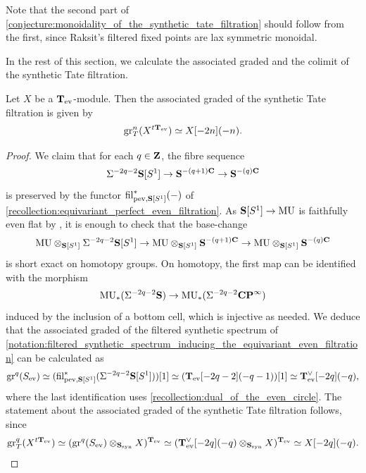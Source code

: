 \documentclass[oneside,a4paper]{amsart}
\begin{document}
\begin{remark}
Note that the second part of \cref{conjecture:monoidality_of_the_synthetic_tate_filtration} should follow from the first, since Raksit's filtered fixed points are lax symmetric monoidal. 
\end{remark}

In the rest of this section, we calculate the associated graded and the colimit of the synthetic Tate filtration. 

\begin{proposition}
\label{proposition:associated_graded_of_the_synthetic_tate_filtration}
Let $X$ be a $\mathbf{T}_{\mathrm{ev}}$-module. Then the associated graded of the synthetic Tate filtration is given by 
\[
\operatorname{gr}^{n}_{T}(X^{t \mathbf{T}_{\mathrm{ev}}}) \simeq X[-2n](-n). 
\]
\end{proposition}

\begin{proof}
We claim that for each $q \in \mathbf{Z}$, the fibre sequence
\[
\Sigma^{-2q-2} \mathbf{S}[S^{1}] \rightarrow \mathbf{S}^{-(q+1)\mathbf{C}} \rightarrow \mathbf{S}^{-(q)\mathbf{C}}
\]
is preserved by the functor $\operatorname{fil}^{\ast}_{\mathrm{pev}, \mathbf{S}[S^{1}]}(-)$ of \cref{recollection:equivariant_perfect_even_filtration}. As $\mathbf{S}[S^{1}] \rightarrow \mathrm{MU}$ is faithfully even flat by \cite[{Corollary 2.36}]{antieau2024cyclotomic}, it is enough to check that the base-change 
\[
\mathrm{MU} \otimes_{\mathbf{S}[S^{1}]} \Sigma^{-2q-2} \mathbf{S}[S^{1}] \rightarrow \mathrm{MU} \otimes_{\mathbf{S}[S^{1}]} \mathbf{S}^{-(q+1)\mathbf{C}} \rightarrow \mathrm{MU} \otimes_{\mathbf{S}[S^{1}]} \mathbf{S}^{-(q)\mathbf{C}}
\]
is short exact on homotopy groups. On homotopy, the first map can be identified with the morphism
\[
\mathrm{MU}_{*}(\Sigma^{-2q-2} \mathbf{S}) \rightarrow \mathrm{MU}_{*}(\Sigma^{-2q-2} \mathbf{CP}^{\infty}) 
\]
induced by the inclusion of a bottom cell, which is injective as needed. We deduce that the associated graded of the filtered synthetic spectrum of \cref{notation:filtered_synthetic_spectrum_inducing_the_equivariant_even_filtration} can be calculated as 
\[
\operatorname{gr}^{q}(S_{\mathrm{ev}}) \simeq (\operatorname{fil}^{\ast}_{\mathrm{pev}, \mathbf{S}[S^{1}]}(\Sigma^{-2q-2} \mathbf{S} [S^{1}]))[1] \simeq (\mathbf{T}_{\mathrm{ev}}[-2q-2](-q-1))[1] \simeq \mathbf{T}_{\mathrm{ev}}^{\vee}[-2q](-q),
\]
where the last identification uses \cref{recollection:dual_of_the_even_circle}. The statement about the associated graded of the synthetic Tate filtration follows, since 
\[
\operatorname{gr}^{q}_{T}(X^{t \mathbf{T}_{\mathrm{ev}}}) \simeq (\operatorname{gr}^{q}(S_{\mathrm{ev}}) \otimes_{\mathbf{S}_{\mathrm{syn}}} X)^{\mathbf{T}_{\mathrm{ev}}} \simeq (\mathbf{T}_{\mathrm{ev}}^{\vee}[-2q](-q) \otimes_{\mathbf{S}_{\mathrm{syn}}} X)^{\mathbf{T}_{\mathrm{ev}}} \simeq X[-2q](-q). 
\]
\end{proof}
\end{document}
